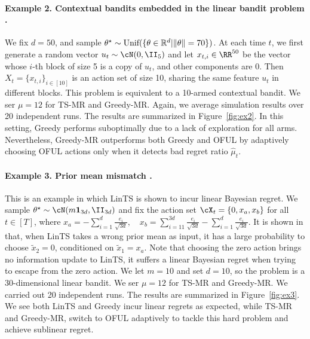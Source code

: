 \paragraph{Example 2. Contextual bandits embedded in the linear bandit problem  \citep{abbasi2013online}.} We fix $d = 50$, and sample $\theta^\star\sim\text{Unif}(\{\theta \in \mathbb{R}^d|\|\theta\|= 70\}) $. At each time $t$, we first  generate a random vector $u_t \sim \cN(0, \II_5)$ and let $x_{t,i}\in \RR^{50}$ be the vector whose $i$-th block of size 5 is a  copy of $u_t$, and other components are 0. Then $X_t = \{x_{t,i}\}_{i\in [10] }$ is an action set of size 10, sharing the same feature $u_t$ in different blocks. This problem is equivalent to a 10-armed contextual bandit. We ser $\mu = 12$ for TS-MR and Greedy-MR. Again, we average simulation results over 20 independent runs. The results are summarized in Figure~\ref{fig:ex2}. In this setting, Greedy performs suboptimally due to a lack of exploration for all arms. Nevertheless, Greedy-MR outperforms both Greedy and OFUL by adaptively choosing OFUL actions only when it detects bad regret ratio $\hat{\mu}_t$.  



\paragraph{Example 3. Prior mean mismatch \citep{hamidi2020frequentist}.} This is an example in which LinTS is shown to incur linear Bayesian regret. We sample $\theta^\star \sim \cN(m \mathbf{1}_{3d}, \II_{3d})$ and fix the action set $\cX_t = \{0, x_a, x_b\}$ for all $t\in[T]$, where $x_a = - \sum_{i=1}^{d} \frac{e_i}{\sqrt{3d}},  \quad x_b = \sum_{i=11}^{3d} \frac{e_i}{\sqrt{3d}}  - \sum_{i=1}^{d} \frac{e_i}{\sqrt{3d}}$.
It is shown in \cite{hamidi2020frequentist} that, when LinTS takes a wrong prior mean as input,  it has a large probability to choose  $\tilde{x}_2 = 0$, conditioned on $\tilde{x}_1 = x_a$. Note that choosing the zero action brings no information update to LinTS, it suffers a linear Bayesian regret when trying to escape from the zero action. We let $m = 10$ and set $d = 10$, so the problem is a $30$-dimensional linear bandit. We ser $\mu = 12$ for TS-MR and Greedy-MR. We carried out 20 independent runs. The results are summarized in Figure~\ref{fig:ex3}. We see both LinTS and Greedy incur linear regrets as expected, while TS-MR and Greedy-MR, switch to OFUL adaptively to tackle this hard problem  and achieve sublinear regret.









